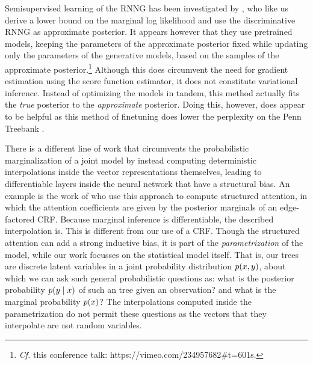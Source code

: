   Semisupervised learning of the RNNG has been investigated by \citet{cheng2017rnng}, who like us derive a lower bound on the marginal log likelihood and use the discriminative RNNG as approximate posterior. It appears however that they use pretrained models, keeping the parameters of the approximate posterior fixed while updating only the parameters of the generative models, based on the samples of the approximate posterior.\footnote{\textit{Cf.} this conference talk: https://vimeo.com/234957682\#t=601s.} Although this does circumvent the need for gradient estimation using the score function estimator, it does not constitute variational inference. Instead of optimizing the models in tandem, this method actually fits the \textit{true} posterior to the \textit{approximate} posterior. Doing this, however, does appear to be helpful as this method of finetuning does lower the perplexity on the Penn Treebank \citep{cheng2017rnng}.

  There is a different line of work that circumvents the probabilistic marginalization of a joint model by instead computing deterministic interpolations inside the vector representations themselves, leading to differentiable layers inside the neural network that have a structural bias. An example is the work of \citet{kim2017structured} who use this approach to compute structured attention, in which the attention coefficients are given by the posterior marginals of an edge-factored CRF. Because marginal inference is differentiable, the described interpolation is. This is different from our use of a CRF. Though the structured attention can add a strong inductive bias, it is part of the \textit{parametrization} of the model, while our work focusses on the statistical model itself. That is, our trees are discrete latent variables in a joint probability distribution $p(x, y)$, about which we can ask such general probabilistic questions as: what is the posterior probability $p(y \mid x)$ of such an tree given an observation? and what is the marginal probability $p(x)$? The interpolations computed inside the parametrization do not permit these questions as the vectors that they interpolate are not random variables.

